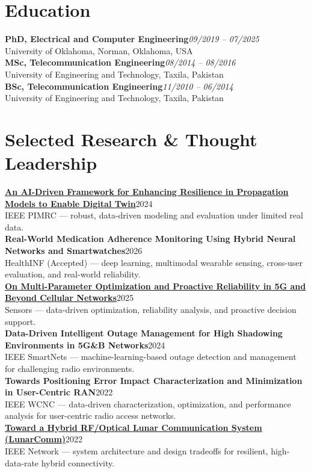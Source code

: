 \documentclass[9pt,letterpaper]{extarticle}
\begin{document}
\section{Education}
\textbf{PhD, Electrical and Computer Engineering}\hfill\textit{09/2019 -- 07/2025}\\
University of Oklahoma, Norman, Oklahoma, USA\\
\textbf{MSc, Telecommunication Engineering}\hfill\textit{08/2014 -- 08/2016}\\
University of Engineering and Technology, Taxila, Pakistan
\\
\textbf{BSc, Telecommunication Engineering}\hfill\textit{11/2010 -- 06/2014}\\
University of Engineering and Technology, Taxila, Pakistan

\section{Selected Research \& Thought Leadership}
\textbf{\href{https://doi.org/10.1109/PIMRC59610.2024.10817403}{An AI-Driven Framework for Enhancing Resilience in Propagation Models to Enable Digital Twin}}\hfill 2024\\[-1pt]
{\small IEEE PIMRC --- robust, data-driven modeling and evaluation under limited real data.}\\
\textbf{Real-World Medication Adherence Monitoring Using Hybrid Neural Networks and Smartwatches}\hfill 2026\\[-1pt]
{\small HealthINF (Accepted) --- deep learning, multimodal wearable sensing, cross-user evaluation, and real-world reliability.}\\
\textbf{\href{https://doi.org/10.3390/s25247651}{On Multi-Parameter Optimization and Proactive Reliability in 5G and Beyond Cellular Networks}}\hfill 2025\\[-1pt]
{\small Sensors --- data-driven optimization, reliability analysis, and proactive decision support.}
\\
\textbf{Data-Driven Intelligent Outage Management for High Shadowing Environments in 5G\&B Networks}\hfill 2024\\[-1pt]
{\small IEEE SmartNets --- machine-learning-based outage detection and management for challenging radio environments.}\\
\textbf{Towards Positioning Error Impact Characterization and Minimization in User-Centric RAN}\hfill 2022\\[-1pt]
{\small IEEE WCNC --- data-driven characterization, optimization, and performance analysis for user-centric radio access networks.}\\
\textbf{\href{https://arxiv.org/abs/2203.15899}{Toward a Hybrid RF/Optical Lunar Communication System (LunarComm)}}\hfill 2022\\[-1pt]
{\small IEEE Network --- system architecture and design tradeoffs for resilient, high-data-rate hybrid connectivity.}
\end{document}
